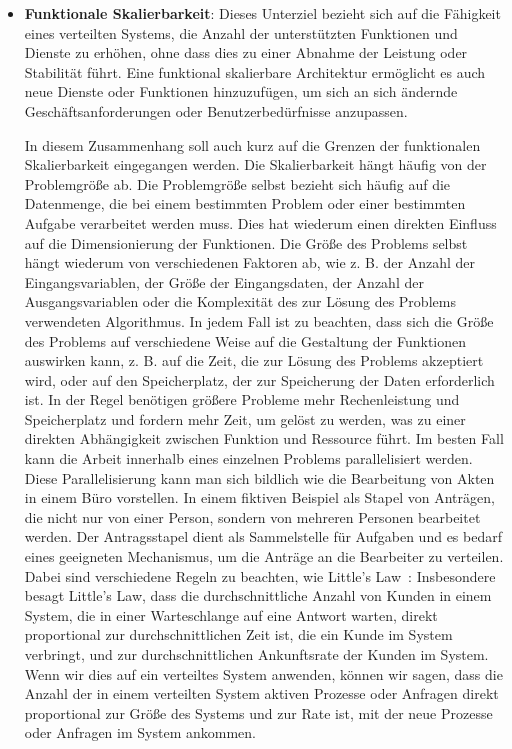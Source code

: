 \documentclass[../vs-script-first-v01.tex]{subfiles}
\begin{document}
\begin{itemize}
  \item \textbf{Funktionale Skalierbarkeit}: Dieses Unterziel bezieht sich auf die Fähigkeit eines verteilten Systems, die Anzahl der unterstützten Funktionen und Dienste zu erhöhen, ohne dass dies zu einer Abnahme der Leistung oder Stabilität führt. Eine funktional skalierbare Architektur ermöglicht es auch neue Dienste oder Funktionen hinzuzufügen, um sich an sich ändernde Geschäftsanforderungen oder Benutzerbedürfnisse anzupassen.

        In diesem Zusammenhang soll auch kurz auf die Grenzen der funktionalen Skalierbarkeit eingegangen werden. Die Skalierbarkeit hängt häufig von der Problemgröße ab. Die Problemgröße selbst bezieht sich häufig auf die Datenmenge, die bei einem bestimmten Problem oder einer bestimmten Aufgabe verarbeitet werden muss. Dies hat wiederum einen direkten Einfluss auf die Dimensionierung der Funktionen. Die Größe des Problems selbst hängt wiederum von verschiedenen Faktoren ab, wie z. B. der Anzahl der Eingangsvariablen, der Größe der Eingangsdaten, der Anzahl der Ausgangsvariablen oder die Komplexität des zur Lösung des Problems verwendeten Algorithmus. In jedem Fall ist zu beachten, dass sich die Größe des Problems auf verschiedene Weise auf die Gestaltung der Funktionen auswirken kann, z. B. auf die Zeit, die zur Lösung des Problems akzeptiert wird, oder auf den Speicherplatz, der zur Speicherung der Daten erforderlich ist. In der Regel benötigen größere Probleme mehr Rechenleistung und Speicherplatz und fordern mehr Zeit, um gelöst zu werden, was zu einer direkten Abhängigkeit zwischen Funktion und Ressource führt. Im besten Fall kann die Arbeit innerhalb eines einzelnen Problems parallelisiert werden. Diese Parallelisierung kann man sich bildlich wie die Bearbeitung von Akten in einem Büro vorstellen. In einem fiktiven Beispiel als Stapel von Anträgen, die nicht nur von einer Person, sondern von mehreren Personen bearbeitet werden. Der Antragsstapel dient als Sammelstelle für Aufgaben und es bedarf eines geeigneten Mechanismus, um die Anträge an die Bearbeiter zu verteilen. Dabei sind verschiedene Regeln zu beachten, wie Little's Law~\cite{little1961proof}:
        Insbesondere besagt Little's Law, dass die durchschnittliche Anzahl von Kunden in einem System, die in einer Warteschlange auf eine Antwort warten, direkt proportional zur durchschnittlichen Zeit ist, die ein Kunde im System verbringt, und zur durchschnittlichen Ankunftsrate der Kunden im System. Wenn wir dies auf ein verteiltes System anwenden, können wir sagen, dass die Anzahl der in einem verteilten System aktiven Prozesse oder Anfragen direkt proportional zur Größe des Systems und zur Rate ist, mit der neue Prozesse oder Anfragen im System ankommen.


\end{itemize}
\end{document}
